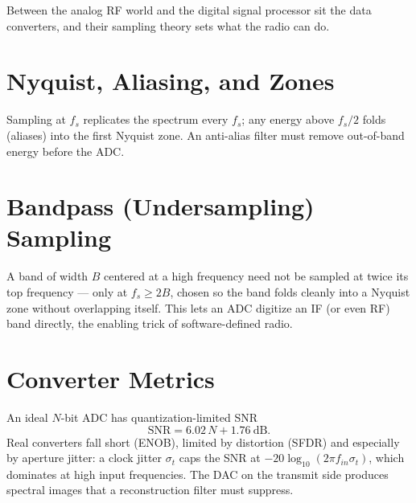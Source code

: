 Between the analog RF world and the digital signal processor sit the
data converters, and their sampling theory sets what the radio can do.

\section{Nyquist, Aliasing, and Zones}
Sampling at $f_s$ replicates the spectrum every $f_s$; any energy above $f_s/2$
folds (aliases) into the first Nyquist zone. An anti-alias filter must remove
out-of-band energy before the ADC.

\section{Bandpass (Undersampling) Sampling}
A band of width $B$ centered at a high frequency need not be sampled at twice its
top frequency --- only at $f_s \ge 2B$, chosen so the band folds cleanly into a
Nyquist zone without overlapping itself. This lets an ADC digitize an IF (or even
RF) band directly, the enabling trick of software-defined radio.

\section{Converter Metrics}
An ideal $N$-bit ADC has quantization-limited SNR
\[ \text{SNR} = 6.02\,N + 1.76\ \text{dB}. \]
Real converters fall short (ENOB), limited by distortion (SFDR) and especially by
aperture jitter: a clock jitter $\sigma_t$ caps the SNR at
$-20\log_{10}(2\pi f_{in}\sigma_t)$, which dominates at high input frequencies.
The DAC on the transmit side produces spectral images that a reconstruction
filter must suppress.
